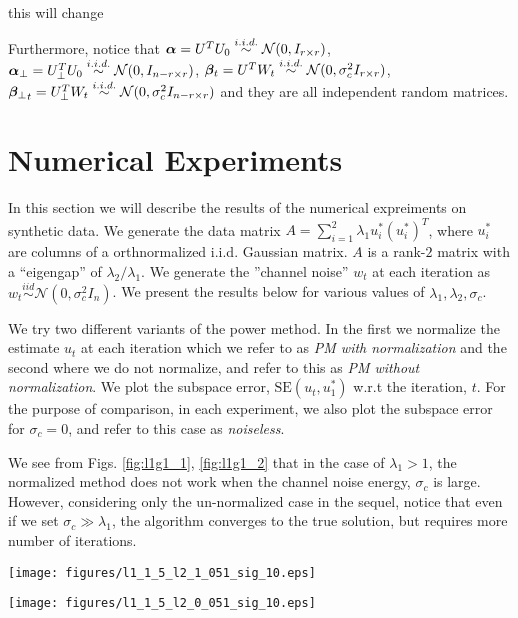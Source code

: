 \documentclass[10pt]{article}
\newcommand{\SE}{\mathrm{SE}}
\begin{document}
{\color{red} this will change 

Furthermore, notice that $\bm{\alpha} = U^T U_0 \overset{i.i.d.}{\sim} \mathcal{N}(0, I_{r \times r})$, $\bm{\alpha}_{\perp} = U_\perp^T U_0 \overset{i.i.d.}{\sim} \mathcal{N}(0, I_{n- r \times r})$, $\bm{\beta}_t = U^T W_t \overset{i.i.d.}{\sim} \mathcal{N}(0, \sigma_c^2 I_{r \times r})$, ${\bm{\beta}_{\perp}}_t = U_\perp^T W_t \overset{i.i.d.}{\sim} \mathcal{N}(0, \sigma_c^2 I_{n- r \times r})$ and they are all independent random matrices. 
}

\color{black}



\clearpage
\null
\clearpage


\section{Numerical Experiments}
In this section we will describe the results of the numerical expreiments on synthetic data. We generate the data matrix $A = \sum_{i=1}^2 \lambda_1 u_i^* (u_i^*)^T$, where $u_i^*$ are columns of a orthnormalized i.i.d. Gaussian matrix. $A$ is a rank-$2$ matrix with a ``eigengap'' of $\lambda_2/\lambda_1$. We generate the ''channel noise'' $w_t$ at each iteration as $w_t \overset{iid}{\sim} \mathcal{N}(0, \sigma_c^2 I_n)$. We present the results below for various values of $\lambda_1, \lambda_2, \sigma_c$. 

We try two different variants of the power method. In the first we normalize the estimate $u_t$ at each iteration which we refer to as {\em PM with normalization} and the second where we do not normalize, and refer to this as {\em PM without normalization}. We plot the subspace error, $\SE(u_t, u_1^*)$ w.r.t the iteration, $t$. For the purpose of comparison, in each experiment, we also plot the subspace error for $\sigma_c = 0$, and refer to this case as {\em noiseless}. 

We see from Figs. \ref{fig:l1g1_1}, \ref{fig:l1g1_2} that in the case of $\lambda_1 > 1$, the normalized method does not work when the channel noise energy, $\sigma_c$ is large. However, considering only the un-normalized case in the sequel, notice that even if we set $\sigma_c \gg \lambda_1$, the algorithm converges to the true solution, but requires more number of iterations.



\begin{minipage}[t]{.5\linewidth}
\centering
\texttt{[image: figures/l1\_1\_5\_l2\_1\_051\_sig\_10.eps]}
\label{fig:chk_r1}
\end{minipage}%
\begin{minipage}[t]{.5\linewidth}
\centering
\texttt{[image: figures/l1\_1\_5\_l2\_0\_051\_sig\_10.eps]}
\label{fig:chk_r2}
\end{minipage}
\end{document}
